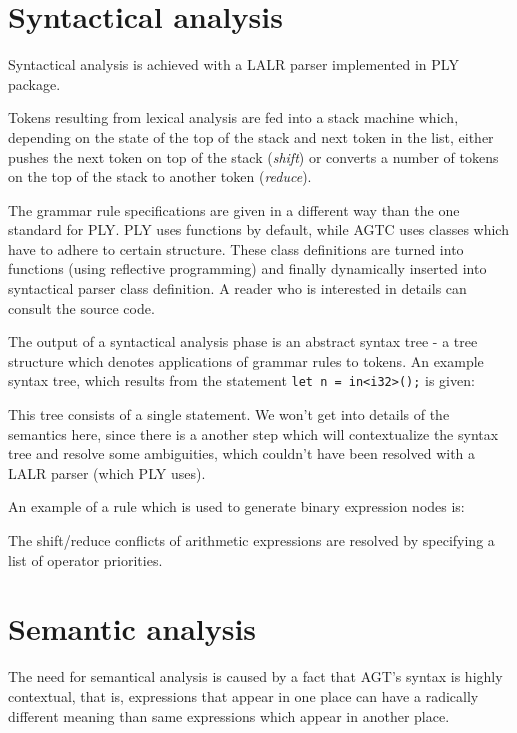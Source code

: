 \documentclass[times, utf8, diplomski]{fer}
\theoremstyle{definition}
\newcommand{\textcode}[3]{
    
}
\begin{document}
\section{Syntactical analysis}

Syntactical analysis is achieved with a LALR parser implemented in PLY package. 

Tokens resulting from lexical analysis are fed into a stack machine which,
depending on the state of the top of the stack and next token in the list,
either pushes the next token on top of the stack (\textit{shift}) or converts
a number of tokens on the top of the stack to another token (\textit{reduce}).

The grammar rule specifications are given in a different way than the
one standard for PLY. PLY uses functions by default, while AGTC uses
classes which have to adhere to certain structure. These class definitions
are turned into functions (using reflective programming) and finally
dynamically inserted into syntactical parser class definition.
A reader who is interested in details can consult the source code.

The output of a syntactical analysis phase is an abstract syntax tree - a tree structure
which denotes applications of grammar rules to tokens. An example syntax tree, which
results from the statement \texttt{let n = in<i32>();} is given:

\textcode{\resdir/compiler/ast}{}{a}

This tree consists of a single statement. We won't get into details of the semantics here,
since there is a another step which will contextualize the syntax tree and resolve some ambiguities,
which couldn't have been resolved with a LALR parser (which PLY uses).

An example of a rule which is used to generate binary expression nodes is:

\textcode{\resdir/compiler/rule.py}{}{a}

The shift/reduce conflicts of arithmetic expressions are resolved by specifying
a list of operator priorities.

\section{Semantic analysis}

The need for semantical analysis is caused by a fact that AGT's syntax is highly contextual,
that is, expressions that appear in one place can have a radically different meaning
than same expressions which appear in another place.
\end{document}

